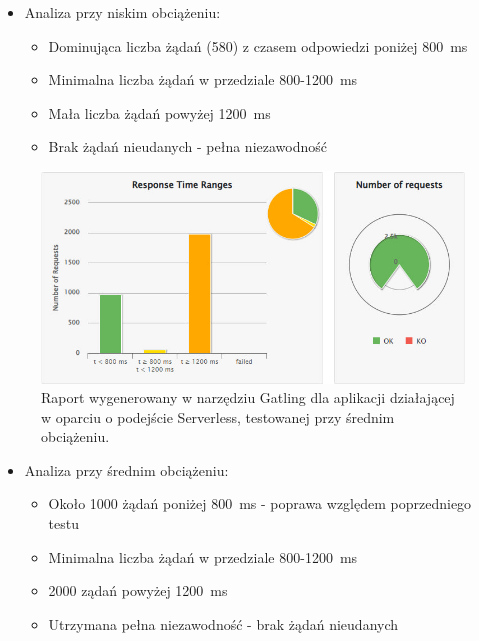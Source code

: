 \documentclass[runningheads,12pt]{llncs}
\begin{document}
\begin{itemize}
  \item Analiza przy niskim obciążeniu:
  \begin{itemize}
    \item Dominująca liczba żądań (580) z czasem odpowiedzi poniżej 800~ms
    \item Minimalna liczba żądań w przedziale 800-1200~ms
    \item Mała liczba żądań powyżej 1200~ms
    \item Brak żądań nieudanych - pełna niezawodność
  \end{itemize}
\end{itemize}

\newpage

\begin{figure}
    \includegraphics[width=\linewidth]{images/serverless-gatling-middle-graph.jpg}
    \caption{Raport wygenerowany w narzędziu Gatling dla aplikacji działającej w oparciu o podejście Serverless, testowanej przy średnim obciążeniu.} \label{fig2}
\end{figure}

\begin{itemize}
  \item Analiza przy średnim obciążeniu:
  \begin{itemize}
    \item Około 1000 żądań poniżej 800~ms - poprawa względem poprzedniego testu
    \item Minimalna liczba żądań w przedziale 800-1200~ms
    \item 2000 ządań powyżej 1200~ms
    \item Utrzymana pełna niezawodność - brak żądań nieudanych
  \end{itemize}
\end{itemize}

\newpage
\end{document}
